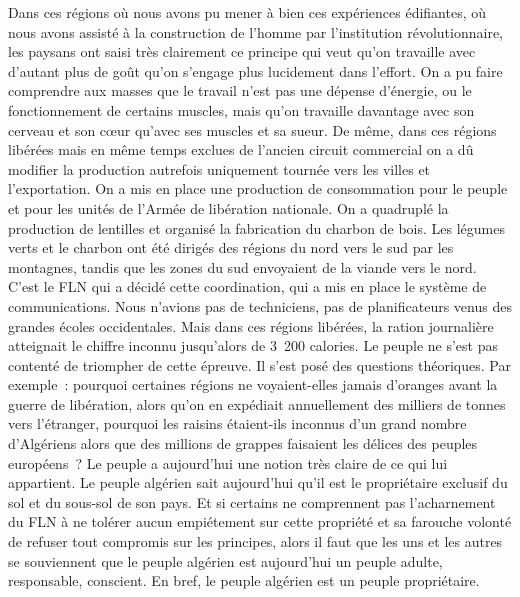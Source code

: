 \documentclass[french,twoside]{book} %
\begin{document}
\noindent Dans ces régions où nous avons pu mener à bien ces expériences édifiantes, où nous avons assisté à la construction de l’homme par l’institution révolutionnaire, les paysans ont saisi très clairement ce principe qui veut qu’on travaille avec d’autant plus de goût qu’on s’engage plus lucidement dans l’effort. On a pu faire comprendre aux masses que le travail n’est pas une dépense d’énergie, ou le fonctionnement de certains muscles, mais qu’on travaille davantage avec son cerveau et son cœur   qu’avec ses muscles et sa sueur. De même, dans ces régions libérées mais en même temps exclues de l’ancien circuit commercial on a dû modifier la production autrefois uniquement tournée vers les villes et l’exportation. On a mis en place une production de consommation pour le peuple et pour les unités de l’Armée de libération nationale. On a quadruplé la production de lentilles et organisé la fabrication du charbon de bois. Les légumes verts et le charbon ont été dirigés des régions du nord vers le sud par les montagnes, tandis que les zones du sud envoyaient de la viande vers le nord. C’est le FLN qui a décidé cette coordination, qui a mis en place le système de communications. Nous n’avions pas de techniciens, pas de planificateurs venus des grandes écoles occidentales. Mais dans ces régions libérées, la ration journalière atteignait le chiffre inconnu jusqu’alors de 3 200 calories. Le peuple ne s’est pas contenté de triompher de cette épreuve. Il s’est posé des questions théoriques. Par exemple : pourquoi certaines régions ne voyaient-elles jamais d’oranges avant la guerre de libération, alors qu’on en expédiait annuellement des milliers de tonnes vers l’étranger, pourquoi les raisins étaient-ils inconnus d’un grand nombre d’Algériens alors que des millions de grappes faisaient les délices des peuples européens ? Le peuple a aujourd’hui une notion très claire de ce qui lui appartient. Le peuple algérien sait aujourd’hui qu’il est le propriétaire exclusif du sol et du sous-sol de son pays. Et si certains ne comprennent pas l’acharnement du FLN à ne tolérer aucun empiétement sur cette propriété et sa farouche volonté de refuser tout compromis sur les principes, alors il faut que les uns et les autres se souviennent que le peuple algérien est aujourd’hui un peuple adulte, responsable, conscient. En bref, le peuple algérien est un peuple propriétaire.\par
\bigbreak
\end{document}
